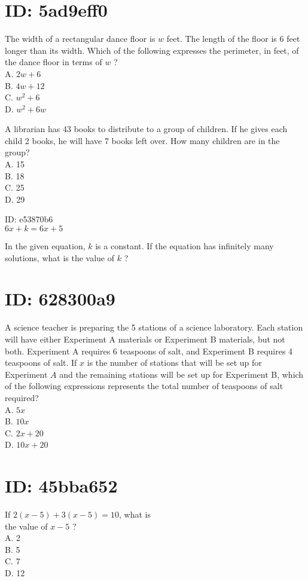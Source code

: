 \section*{ID: 5ad9eff0}
The width of a rectangular dance floor is $w$ feet. The length of the floor is 6 feet longer than its width. Which of the following expresses the perimeter, in feet, of the dance floor in terms of $w$ ?\\
A. $2 w+6$\\
B. $4 w+12$\\
C. $w^{2}+6$\\
D. $w^{2}+6 w$

A librarian has 43 books to distribute to a group of children. If he gives each child 2 books, he will have 7 books left over. How many children are in the group?\\
A. 15\\
B. 18\\
C. 25\\
D. 29

ID: e53870b6\\
$6 x+k=6 x+5$

In the given equation, $k$ is a constant. If the equation has infinitely many solutions, what is the value of $k$ ?

\section*{ID: 628300a9}
A science teacher is preparing the 5 stations of a science laboratory. Each station will have either Experiment A materials or Experiment B materials, but not both. Experiment A requires 6 teaspoons of salt, and Experiment B requires 4 teaspoons of salt. If $x$ is the number of stations that will be set up for Experiment $A$ and the remaining stations will be set up for Experiment B, which of the following expressions represents the total number of teaspoons of salt required?\\
A. $5 x$\\
B. $10 x$\\
C. $2 x+20$\\
D. $10 x+20$

\section*{ID: 45bba652}
If $2(x-5)+3(x-5)=10$, what is\\
the value of $x-5$ ?\\
A. 2\\
B. 5\\
C. 7\\
D. 12

